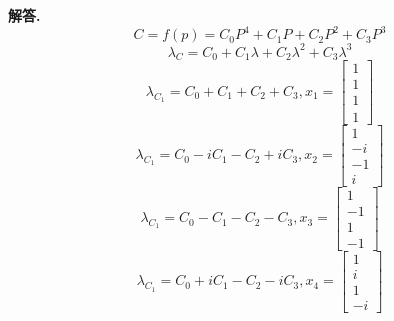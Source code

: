 \documentclass[12pt, a4paper, oneside]{article}
\newenvironment{solution}{\par\noindent\textbf{解答. }}{\par}
\begin{document}
\begin{CJK}{UTF8}{gbsn}
\begin{solution}
  $$ C = f(p) = C_0P^4 + C_1P + C_2P^2 +C_3P^3 $$
  $$ \lambda_C = C_0 + C_1\lambda + C_2\lambda^2 + C_3\lambda^3 $$
  $$ \lambda_{C_1} = C_0 + C_1 + C_2  + C_3, x_1 = \begin{bmatrix}
    1 \\ 1 \\ 1 \\ 1
  \end{bmatrix}$$
  $$ \lambda_{C_1} = C_0 - iC_1 - C_2  + iC_3, x_2 = \begin{bmatrix}
    1 \\ -i \\ -1 \\ i
  \end{bmatrix} $$
  $$ \lambda_{C_1} = C_0 - C_1 - C_2  - C_3, x_3 = \begin{bmatrix}
    1 \\ -1 \\ 1\\ -1
  \end{bmatrix} $$
  $$ \lambda_{C_1} = C_0 + iC_1 - C_2  - iC_3, x_4 = \begin{bmatrix}
    1 \\ i \\ 1\\ -i
  \end{bmatrix} $$



\end{solution}


\end{CJK}
\end{document}
